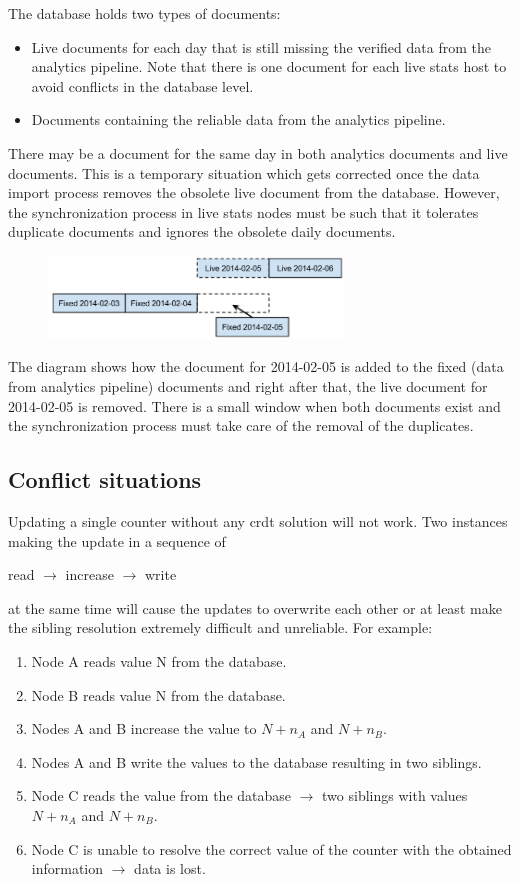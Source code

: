 \documentclass[11pt,a4paper]{report}
\begin{document}
The database holds two types of documents:
\begin{itemize}
	\item Live documents for each day that is still missing the verified data from the analytics pipeline. Note that there is one document for each live stats host to avoid conflicts in the database level.
	\item Documents containing the reliable data from the analytics pipeline.
\end{itemize}

There may be a document for the same day in both analytics documents and live documents. This is a temporary situation which gets corrected once the data import process removes the obsolete live document from the database. However, the synchronization process in live stats nodes must be such that it tolerates duplicate documents and ignores the obsolete daily documents.

\begin{figure}[!h]
	\centering
	\includegraphics[width=0.7\textwidth]{./img/image2.png}
\end{figure}

The diagram shows how the document for 2014-02-05 is added to the fixed (data from analytics pipeline) documents and right after that, the live document for 2014-02-05 is removed. There is a small window when both documents exist and the synchronization process must take care of the removal of the duplicates.

\subsection{Conflict situations}
Updating a single counter without any \gls{crdt} solution will not work. Two instances making the update in a sequence of 
\begin{center}
read $\rightarrow$ increase $\rightarrow$ write 
\end{center}

at the same time will cause the updates to overwrite each other or at least make the sibling resolution extremely difficult and unreliable.
For example:
\begin{enumerate}
\item Node A reads value N from the database.
\item Node B reads value N from the database. 
\item Nodes A and B increase the value to $N+n_A$ and $N+n_B$. 
\item Nodes A and B write the values to the database resulting in two siblings. 
\item Node C reads the value from the database $\rightarrow$ two siblings with values $N+n_A$ and $N+n_B$. 
\item Node C is unable to resolve the correct value of the counter with the obtained information $\rightarrow$ data is lost.
\end{enumerate}
\end{document}
